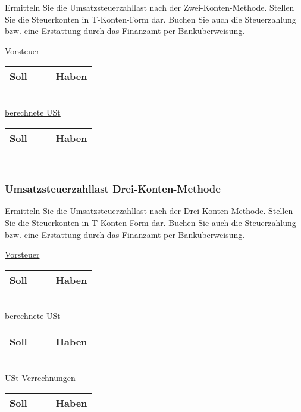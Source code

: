 \documentclass[paper=a4, fontsize=11pt]{scrartcl}
\numberwithin{equation}{section}
\numberwithin{figure}{section}
\numberwithin{table}{section}
\begin{document}
{Ermitteln Sie die Umsatzsteuerzahllast nach der Zwei-Konten-Methode. Stellen Sie die Steuerkonten in T-Konten-Form dar. Buchen Sie auch die Steuerzahlung bzw. eine Erstattung durch das Finanzamt per Banküberweisung.

\underline{Vorsteuer}

\begin{tabular}{cc|cc}
\hline
Soll & & & Haben \\
\hline
\end{tabular}
\\

\underline{berechnete USt}

\begin{tabular}{cc|cc}
\hline
Soll & & & Haben \\
\hline
\end{tabular}
\\


\subsubsection{Umsatzsteuerzahllast Drei-Konten-Methode}

Ermitteln Sie die Umsatzsteuerzahllast nach der Drei-Konten-Methode. Stellen Sie die Steuerkonten in T-Konten-Form dar. Buchen Sie auch die Steuerzahlung bzw. eine Erstattung durch das Finanzamt per Banküberweisung.

\underline{Vorsteuer}

\begin{tabular}{cc|cc}
\hline
Soll & & & Haben \\
\hline
\end{tabular}
\\

\underline{berechnete USt}

\begin{tabular}{cc|cc}
\hline
Soll & & & Haben \\
\hline
\end{tabular}
\\

\underline{USt-Verrechnungen}

\begin{tabular}{cc|cc}
\hline
Soll & & & Haben \\
\hline
\end{tabular}
\\


}
\end{document}
